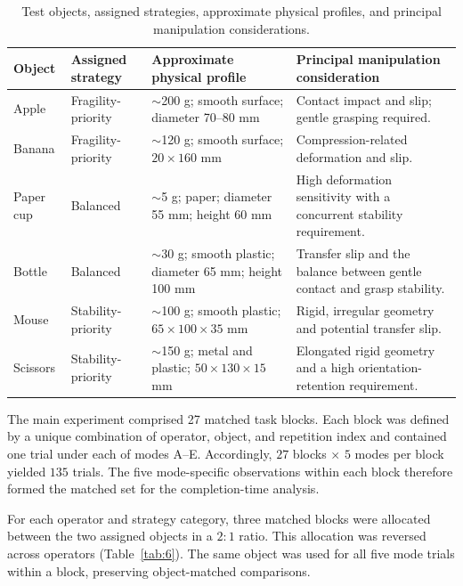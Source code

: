 \begin{table}[!t]
\centering
\caption{Test objects, assigned strategies, approximate physical profiles, and principal manipulation considerations.}
\label{tab:5}
\small
\setlength{\tabcolsep}{6pt}
\renewcommand{\arraystretch}{1.16}
\begin{tabularx}{\textwidth}{@{}p{}p{}p{}Y@{}}
\toprule
Object & Assigned strategy & Approximate physical profile & Principal manipulation consideration \\
\midrule
Apple & Fragility-priority & $\sim$200 g; smooth surface; diameter 70--80 mm & Contact impact and slip; gentle grasping required. \\
Banana & Fragility-priority & $\sim$120 g; smooth surface; $20\times160$ mm & Compression-related deformation and slip. \\
Paper cup & Balanced & $\sim$5 g; paper; diameter 55 mm; height 60 mm & High deformation sensitivity with a concurrent stability requirement. \\
Bottle & Balanced & $\sim$30 g; smooth plastic; diameter 65 mm; height 100 mm & Transfer slip and the balance between gentle contact and grasp stability. \\
Mouse & Stability-priority & $\sim$100 g; smooth plastic; $65\times100\times35$ mm & Rigid, irregular geometry and potential transfer slip. \\
Scissors & Stability-priority & $\sim$150 g; metal and plastic; $50\times130\times15$ mm & Elongated rigid geometry and a high orientation-retention requirement. \\
\bottomrule
\end{tabularx}
\end{table}

The main experiment comprised 27 matched task blocks. Each block was defined by a unique combination of operator, object, and repetition index and contained one trial under each of modes A--E. Accordingly, $27$ blocks $\times$ $5$ modes per block yielded $135$ trials. The five mode-specific observations within each block therefore formed the matched set for the completion-time analysis.

For each operator and strategy category, three matched blocks were allocated between the two assigned objects in a $2{:}1$ ratio. This allocation was reversed across operators (Table~\ref{tab:6}). The same object was used for all five mode trials within a block, preserving object-matched comparisons.

